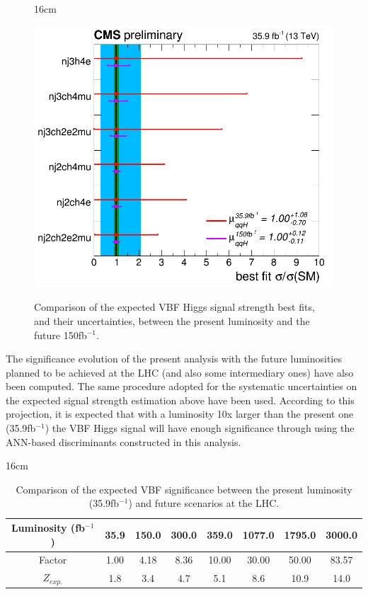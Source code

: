 \begin{figure}[hbtp]{16cm}
	\caption{Comparison of the expected VBF Higgs signal strength best fits, and their uncertainties, between the present luminosity and the future 150fb$^{-1}$.}	
	\centering
	\includegraphics[scale=0.3,trim={0.6cm 0cm 0.8cm 0cm},clip]{ChapterAnalysis/figs/ChannelsCompatibility_39fb_vs_150fb}
	\label{fig:vbf_signal_strengths_150fb}
\end{figure}

The significance evolution of the present analysis with the future luminosities planned to be achieved at the LHC (and also some intermediary ones) have also been computed. The same procedure adopted for the systematic uncertainties on the expected signal strength estimation above have been used. According to this projection, it is expected that with a luminosity 10x larger than the present one (35.9fb$^{-1}$) the VBF Higgs signal will have enough significance through using the ANN-based discriminants constructed in this analysis.

\begin{table}[hbtp]{16cm}
	\caption{Comparison of the expected VBF significance between the present luminosity (35.9fb$^{-1}$) and future scenarios at the LHC.}
	\centering
	\begin{tabular}{c|c|c|c|c|c|c|c}
		\hline
		\rowcolor{light_gray}
		Luminosity (fb$^{-1}$) & 35.9 & 150.0 & 300.0 & 359.0 & 1077.0 & 1795.0 & 3000.0\\
		\hline
		\rowcolor{light_gray}
		Factor                 & 1.00 & 4.18  & 8.36  & 10.00 & 30.00  & 50.00  & 83.57\\
		\hline
		$Z_{exp.}$  & 1.8  & 3.4   & 4.7   & 5.1   & 8.6    & 10.9   & 14.0\\
		\hline
	\end{tabular}
	\label{tab:vbf_significance_vs_luminosities}
\end{table}


